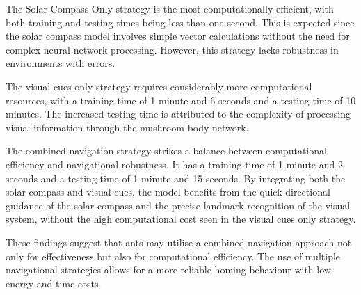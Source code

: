 \documentclass[12pt,a4paper]{article}
\begin{document}
The Solar Compass Only strategy is the most computationally efficient, with both training and testing times being less than one second. This is expected since the solar compass model involves simple vector calculations without the need for complex neural network processing. However, this strategy lacks robustness in environments with errors.

The visual cues only strategy requires considerably more computational resources, with a training time of 1 minute and 6 seconds and a testing time of 10 minutes. The increased testing time is attributed to the complexity of processing visual information through the mushroom body network.

The combined navigation strategy strikes a balance between computational efficiency and navigational robustness. It has a training time of 1 minute and 2 seconds and a testing time of 1 minute and 15 seconds. By integrating both the solar compass and visual cues, the model benefits from the quick directional guidance of the solar compass and the precise landmark recognition of the visual system, without the high computational cost seen in the visual cues only strategy.

These findings suggest that ants may utilise a combined navigation approach not only for effectiveness but also for computational efficiency. The use of multiple navigational strategies allows for a more reliable homing behaviour with low energy and time costs.

\printbibliography
\end{document}
